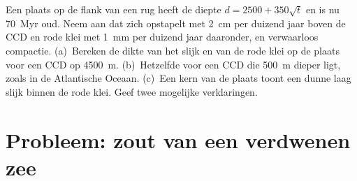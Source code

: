 \begin{exercise}[$\star\star\star$]\label{exo:b1:chemical-biogenic-sediments:12}
Een plaats op de flank van een rug heeft de diepte $d = 2500 + 350\sqrt t$ en is nu \qty{70}{Myr} oud. Neem aan dat  zich opstapelt met \qty{2}{cm} per duizend jaar boven de CCD en rode klei met \qty{1}{mm} per duizend jaar daaronder, en verwaarloos compactie. (a)~Bereken de dikte van het slijk en van de rode klei op de plaats voor een CCD op \qty{4500}{m}. (b)~Hetzelfde voor een CCD die \qty{500}{m} dieper ligt, zoals in de Atlantische Oceaan. (c)~Een kern van de plaats toont een dunne laag slijk binnen de rode klei. Geef twee mogelijke verklaringen.
\end{exercise}

\section{Probleem: zout van een verdwenen zee}


